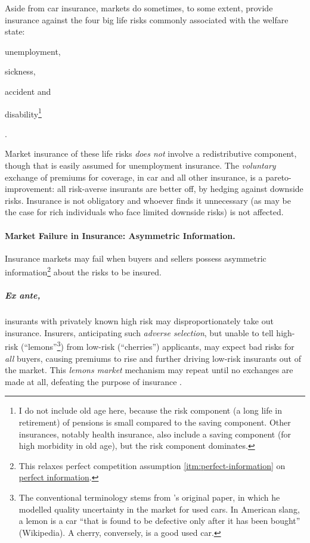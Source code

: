 Aside from car insurance, markets do sometimes, to some extent, provide insurance against the four big life risks commonly associated with the welfare state: \begin{inparaenum}[1)] 
	\item unemployment, 
	\item sickness, 
	\item accident and 
	\item disability\footnote{
		I do not include old age here, because the risk component (a long life in retirement) of pensions is small compared to the saving component. Other insurances, notably health insurance, also include a saving component (for high morbidity in old age), but the risk component dominates.}
\end{inparaenum}.
	
Market insurance of these life risks \emph{does not} involve a redistributive component, though that is easily assumed for unemployment insurance. The \emph{voluntary} exchange of premiums for coverage, in car and all other insurance, is a pareto-improvement: all risk-averse insurants are better off, by hedging against downside risks. Insurance is not obligatory and whoever finds it unnecessary (as may be the case for rich individuals who face limited downside risks) is not affected.

\paragraph{Market Failure in Insurance: Asymmetric Information.}
\label{sec:asymmetric-information}

Insurance markets may fail when buyers and sellers possess asymmetric information\footnote{
	This relaxes perfect competition assumption \ref{itm:perfect-information} on \hyperref[itm:perfect-information]{perfect information}.} 
about the risks to be insured. 

\subparagraph[Adverse Selection]{Ex ante,} \label{sec:adverse-selection} insurants with privately known high risk may disproportionately take out insurance. Insurers, anticipating such \emph{adverse selection}, but unable to tell high-risk (``lemons''\footnote{
	The conventional terminology stems from \citeauthor{Akerlof-1970-aa}'s original paper, in which he modelled quality uncertainty in the market for used cars. In American slang, a lemon is a car ``that is found to be defective only after it has been bought'' (Wikipedia). A cherry, conversely, is a good used car.}) 
from low-risk (``cherries'') applicants, may expect bad risks for \emph{all} buyers, causing premiums to rise and further driving low-risk insurants out of the market. This \emph{lemons market} mechanism may repeat until no exchanges are made at all, defeating the purpose of insurance \citep{Akerlof-1970-aa}. 

